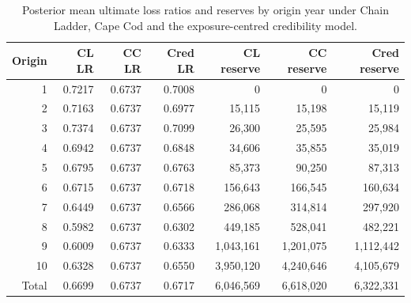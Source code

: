 \begin{table}[htbp]
\centering
\begin{tabular}{rrrrrrr}
\toprule
Origin & CL LR & CC LR & Cred LR & CL reserve & CC reserve & Cred reserve \\
\midrule
1 & 0.7217 & 0.6737 & 0.7008 & 0 & 0 & 0 \\
2 & 0.7163 & 0.6737 & 0.6977 & 15,115 & 15,198 & 15,119 \\
3 & 0.7374 & 0.6737 & 0.7099 & 26,300 & 25,595 & 25,984 \\
4 & 0.6942 & 0.6737 & 0.6848 & 34,606 & 35,855 & 35,019 \\
5 & 0.6795 & 0.6737 & 0.6763 & 85,373 & 90,250 & 87,313 \\
6 & 0.6715 & 0.6737 & 0.6718 & 156,643 & 166,545 & 160,634 \\
7 & 0.6449 & 0.6737 & 0.6566 & 286,068 & 314,814 & 297,920 \\
8 & 0.5982 & 0.6737 & 0.6302 & 449,185 & 528,041 & 482,221 \\
9 & 0.6009 & 0.6737 & 0.6333 & 1,043,161 & 1,201,075 & 1,112,442 \\
10 & 0.6328 & 0.6737 & 0.6550 & 3,950,120 & 4,240,646 & 4,105,679 \\
\midrule
Total & 0.6699 & 0.6737 & 0.6717 & 6,046,569 & 6,618,020 & 6,322,331 \\
\bottomrule
\end{tabular}
\caption{Posterior mean ultimate loss ratios and reserves by origin year under Chain Ladder, Cape Cod and the exposure-centred credibility model.}
\label{tab:saluz_results}
\end{table}